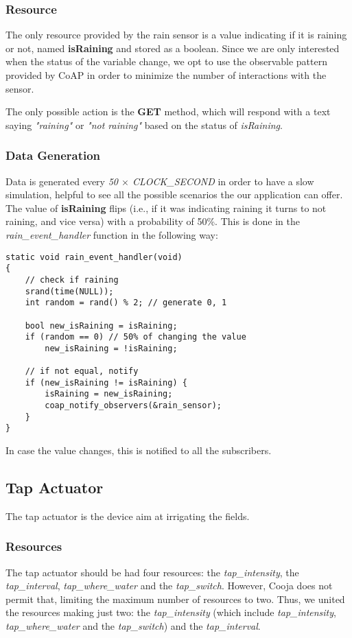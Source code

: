 \subsubsection{Resource}
The only resource provided by the rain sensor is a value indicating if it is raining or not, named \textbf{isRaining} and stored as a boolean. Since we are only interested when the status of the variable change, we opt to use the observable pattern provided by CoAP in order to minimize the number of interactions with the sensor.

The only possible action is the \textbf{GET} method, which will respond with a text saying \textit{"raining"} or \textit{"not raining"} based on the status of \textit{isRaining}.

\subsubsection{Data Generation}
Data is generated every \textit{50 $\times$ CLOCK\_SECOND}  in order to have a slow simulation, helpful to see all the possible scenarios the our application can offer. The value of \textbf{isRaining} flips (i.e., if it was indicating raining it turns to not raining, and vice versa) with a probability of 50\%. This is done in the \textit{rain\_event\_handler} function in the following way:

\begin{lstlisting}
static void rain_event_handler(void)
{
    // check if raining
    srand(time(NULL));
    int random = rand() % 2; // generate 0, 1
    
    bool new_isRaining = isRaining;
    if (random == 0) // 50% of changing the value
        new_isRaining = !isRaining;

    // if not equal, notify
    if (new_isRaining != isRaining) {
        isRaining = new_isRaining;
        coap_notify_observers(&rain_sensor);
    }
}
\end{lstlisting}

In case the value changes, this is notified to all the subscribers.




\subsection{Tap Actuator}
The tap actuator is the device aim at irrigating the fields.

\subsubsection{Resources}
The tap actuator should be had four resources: the \textit{tap\_intensity}, the \textit{tap\_interval}, \textit{tap\_where\_water} and the \textit{tap\_switch}. However, Cooja does not permit that, limiting the maximum number of resources to two. Thus, we united the resources making just two: the \textit{tap\_intensity} (which include  \textit{tap\_intensity}, \textit{tap\_where\_water} and the \textit{tap\_switch}) and the \textit{tap\_interval}.

